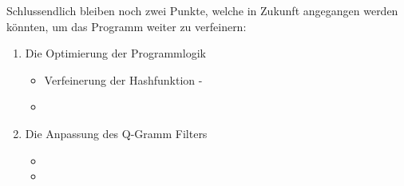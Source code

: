 Schlussendlich bleiben noch zwei Punkte, welche in Zukunft angegangen werden könnten, um das Programm weiter zu verfeinern:
\begin{enumerate}

\item Die Optimierung der Programmlogik \\
    \begin{itemize}
        \item Verfeinerung der Hashfunktion -
        \item
    \end{itemize}


\item Die Anpassung des Q-Gramm Filters
    \begin{itemize}
        \item
        \item
    \end{itemize}

\end{enumerate}



